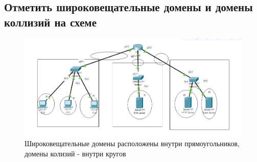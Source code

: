 \documentclass[12pt]{report}
\begin{document}
\subsection*{Отметить широковещательные домены и домены коллизий на схеме}

\begin{figure}[H]
	\begin{center}
		\includegraphics[scale=0.5]{img/18.png}
	\end{center}
	\caption{Широковещательные домены расположены внутри прямоугольников, домены колизий - внутри кругов}
	\label{fig:18}
\end{figure}




	
\end{document}
